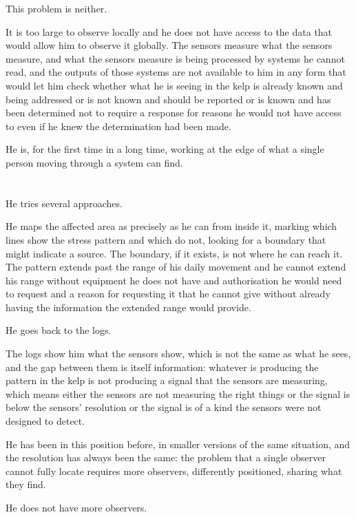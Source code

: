 This problem is neither.

It is too large to observe locally and he does not
have access to the data that would allow him to
observe it globally. The sensors measure what the
sensors measure, and what the sensors measure is
being processed by systems he cannot read, and the
outputs of those systems are not available to him
in any form that would let him check whether what
he is seeing in the kelp is already known and
being addressed or is not known and should be
reported or is known and has been determined not
to require a response for reasons he would not
have access to even if he knew the determination
had been made.

He is, for the first time in a long time, working
at the edge of what a single person moving through
a system can find.

\section{}

He tries several approaches.

He maps the affected area as precisely as he can
from inside it, marking which lines show the stress
pattern and which do not, looking for a boundary
that might indicate a source. The boundary, if it
exists, is not where he can reach it. The pattern
extends past the range of his daily movement and
he cannot extend his range without equipment he
does not have and authorisation he would need to
request and a reason for requesting it that he
cannot give without already having the information
the extended range would provide.

He goes back to the logs.

The logs show him what the sensors show, which is
not the same as what he sees, and the gap between
them is itself information: whatever is producing
the pattern in the kelp is not producing a signal
that the sensors are measuring, which means either
the sensors are not measuring the right things or
the signal is below the sensors' resolution or the
signal is of a kind the sensors were not designed
to detect.

He has been in this position before, in smaller
versions of the same situation, and the resolution
has always been the same: the problem that a single
observer cannot fully locate requires more observers,
differently positioned, sharing what they find.

He does not have more observers.

